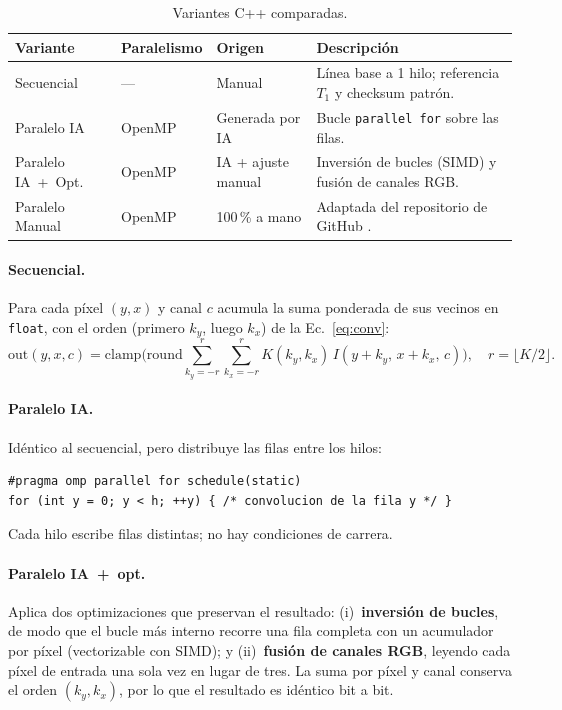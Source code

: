 \documentclass[12pt]{article}
\begin{document}
\begin{table}[H]
\centering
\caption{Variantes C++ comparadas.}
\label{tab:variantes}
\small
\begin{tabularx}{\linewidth}{@{}l l l X@{}}
\toprule
\textbf{Variante} & \textbf{Paralelismo} & \textbf{Origen} & \textbf{Descripción} \\
\midrule
Secuencial & --- & Manual & Línea base a 1 hilo; referencia $T_1$ y checksum patrón. \\
Paralelo IA & OpenMP & Generada por IA & Bucle \texttt{parallel for} sobre las filas. \\
Paralelo IA~+~Opt. & OpenMP & IA + ajuste manual & Inversión de bucles (SIMD) y fusión de canales RGB. \\
Paralelo Manual & OpenMP & 100\,\% a mano & Adaptada del repositorio de GitHub \cite{githubconv}. \\
\bottomrule
\end{tabularx}
\end{table}

\paragraph{Secuencial.} Para cada píxel $(y,x)$ y canal $c$ acumula la suma
ponderada de sus vecinos en \texttt{float}, con el orden (primero $k_y$, luego
$k_x$) de la Ec.~\ref{eq:conv}:
\begin{equation}
  \mathrm{out}(y,x,c)=\mathrm{clamp}\!\Big(\mathrm{round}\!\sum_{k_y=-r}^{r}\sum_{k_x=-r}^{r}
  K(k_y,k_x)\,I(y+k_y,\,x+k_x,\,c)\Big),\quad r=\lfloor K/2\rfloor .
  \label{eq:conv}
\end{equation}

\paragraph{Paralelo IA.} Idéntico al secuencial, pero distribuye las filas entre
los hilos:
\begin{lstlisting}
#pragma omp parallel for schedule(static)
for (int y = 0; y < h; ++y) { /* convolucion de la fila y */ }
\end{lstlisting}
Cada hilo escribe filas distintas; no hay condiciones de carrera.

\paragraph{Paralelo IA~+~opt.} Aplica dos optimizaciones que preservan el
resultado: (i)~\textbf{inversión de bucles}, de modo que el bucle más interno
recorre una fila completa con un acumulador por píxel (vectorizable con SIMD); y
(ii)~\textbf{fusión de canales RGB}, leyendo cada píxel de entrada una sola vez en
lugar de tres. La suma por píxel y canal conserva el orden $(k_y,k_x)$, por lo que
el resultado es idéntico bit a bit.
\end{document}
